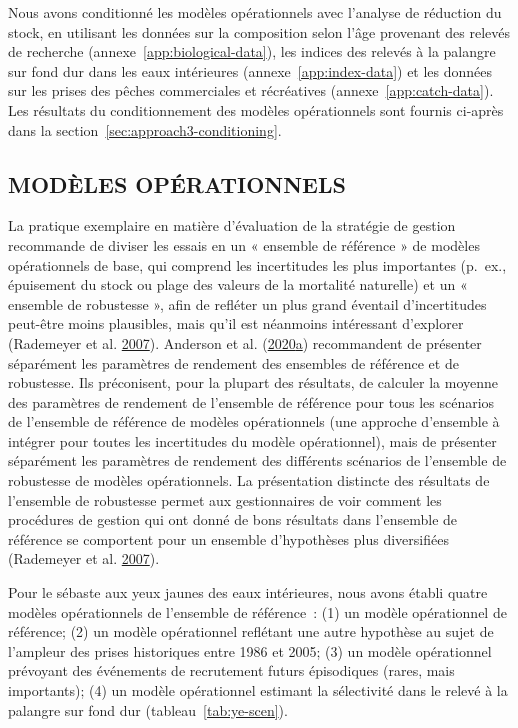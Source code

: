 \documentclass[11pt]{book}
\begin{document}
Nous avons conditionné les modèles opérationnels avec l'analyse de réduction du stock, en utilisant les données sur la composition selon l'âge provenant des relevés de recherche (annexe~\ref{app:biological-data}), les indices des relevés à la palangre sur fond dur dans les eaux intérieures (annexe~\ref{app:index-data}) et les données sur les prises des pêches commerciales et récréatives (annexe~\ref{app:catch-data}). Les résultats du conditionnement des modèles opérationnels sont fournis ci-après dans la section~\ref{sec:approach3-conditioning}.

\hypertarget{sec:approach3-oms}{%
\subsection{MODÈLES OPÉRATIONNELS}\label{sec:approach3-oms}}

La pratique exemplaire en matière d'évaluation de la stratégie de gestion recommande de diviser les essais en un « ensemble de référence » de modèles opérationnels de base, qui comprend les incertitudes les plus importantes (p.~ex., épuisement du stock ou plage des valeurs de la mortalité naturelle) et un « ensemble de robustesse », afin de refléter un plus grand éventail d'incertitudes peut-être moins plausibles, mais qu'il est néanmoins intéressant d'explorer (Rademeyer et al. \protect\hyperlink{ref-rademeyer2007}{2007}). Anderson et al. (\protect\hyperlink{ref-anderson2020gfmp}{2020}\protect\hyperlink{ref-anderson2020gfmp}{a}) recommandent de présenter séparément les paramètres de rendement des ensembles de référence et de robustesse. Ils préconisent, pour la plupart des résultats, de calculer la moyenne des paramètres de rendement de l'ensemble de référence pour tous les scénarios de l'ensemble de référence de modèles opérationnels (une approche d'ensemble à intégrer pour toutes les incertitudes du modèle opérationnel), mais de présenter séparément les paramètres de rendement des différents scénarios de l'ensemble de robustesse de modèles opérationnels. La présentation distincte des résultats de l'ensemble de robustesse permet aux gestionnaires de voir comment les procédures de gestion qui ont donné de bons résultats dans l'ensemble de référence se comportent pour un ensemble d'hypothèses plus diversifiées (Rademeyer et al. \protect\hyperlink{ref-rademeyer2007}{2007}).

Pour le sébaste aux yeux jaunes des eaux intérieures, nous avons établi quatre modèles opérationnels de l'ensemble de référence~: (1) un modèle opérationnel de référence; (2) un modèle opérationnel reflétant une autre hypothèse au sujet de l'ampleur des prises historiques entre 1986 et 2005; (3) un modèle opérationnel prévoyant des événements de recrutement futurs épisodiques (rares, mais importants); (4) un modèle opérationnel estimant la sélectivité dans le relevé à la palangre sur fond dur (tableau~\ref{tab:ye-scen}).
\end{document}
